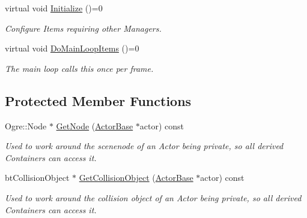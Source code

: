 \begin{DoxyCompactItemize}
virtual void \hyperlink{classphys_1_1ActorContainerBase_af36d5866e0ee9f6f450a4e62642e0928}{Initialize} ()=0
\begin{DoxyCompactList}\small\item\em Configure Items requiring other Managers. \item\end{DoxyCompactList}\item 
virtual void \hyperlink{classphys_1_1ActorContainerBase_a67fbde6a61602253f66fecd0416bdc2f}{DoMainLoopItems} ()=0
\begin{DoxyCompactList}\small\item\em The main loop calls this once per frame. \item\end{DoxyCompactList}\end{DoxyCompactItemize}
\subsection*{Protected Member Functions}
\begin{DoxyCompactItemize}
\item 
Ogre::Node $\ast$ \hyperlink{classphys_1_1ActorContainerBase_a9813fe23051cc1a324bfedd4d35d27ad}{GetNode} (\hyperlink{classphys_1_1ActorBase}{ActorBase} $\ast$actor) const 
\begin{DoxyCompactList}\small\item\em Used to work around the scenenode of an Actor being private, so all derived Containers can access it. \item\end{DoxyCompactList}\item 
btCollisionObject $\ast$ \hyperlink{classphys_1_1ActorContainerBase_a3f3d84f7775d2e8597290e214fedd5f9}{GetCollisionObject} (\hyperlink{classphys_1_1ActorBase}{ActorBase} $\ast$actor) const 
\begin{DoxyCompactList}\small\item\em Used to work around the collision object of an Actor being private, so all derived Containers can access it. \item\end{DoxyCompactList}\end{DoxyCompactItemize}



